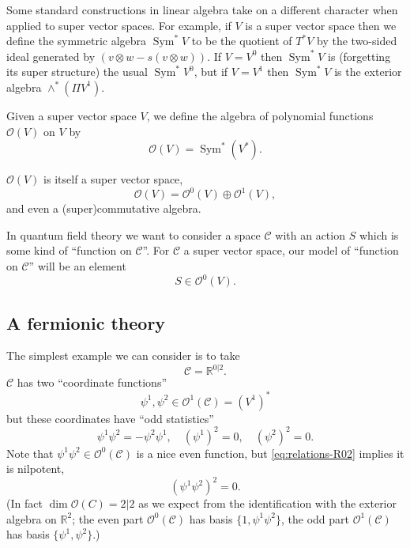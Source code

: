 \documentclass[12pt,letterpaper,reqno]{article}
\numberwithin{equation}{section}
\newcommand{\cC}{\ensuremath{\mathcal C}}
\newcommand{\cO}{\ensuremath{\mathcal O}}
\newcommand{\R}{\ensuremath{\mathbb R}}
\DeclareMathOperator{\Sym}{Sym}
\begin{document}
Some standard constructions in linear algebra take on a different
character when applied to super vector spaces. For example,
if $V$ is a super vector space then we define the symmetric 
algebra $\Sym^* V$ to be the quotient of $T^* V$ by
the two-sided ideal generated by $(v \otimes w - s(v \otimes w))$.
If $V = V^0$ then $\Sym^*V$ is (forgetting its super structure) 
the usual $\Sym^* V^0$,
but if $V = V^1$ then $\Sym^* V$ is the exterior algebra $\wedge^* (\Pi V^1)$.

\begin{defn}
Given a super vector space $V$, 
we define the algebra of polynomial functions $\cO(V)$ on $V$
by
\begin{equation}
  \cO(V) = \Sym^* (V^*).
\end{equation}
\end{defn}

$\cO(V)$ is itself a super vector space,
\begin{equation}
  \cO(V) = \cO^0(V) \oplus \cO^1(V),
\end{equation}
and even a (super)commutative algebra.

In quantum field theory we want to consider a space $\cC$ 
with an action $S$ which is some kind of ``function on $\cC$''. 
For $\cC$ a super vector space, our model of ``function on $\cC$''
will be an element
\begin{equation}
S \in \cO^0(V).
\end{equation}


\subsection{A fermionic theory}

The simplest example we can consider is to take
\begin{equation}
  \cC = \R^{0 \vert 2}.
\end{equation}
$\cC$ has two ``coordinate functions''
\begin{equation}
  \psi^1, \psi^2 \in \cO^1(\cC) = (V^1)^*
\end{equation}
but these coordinates have ``odd statistics''
\begin{equation} \label{eq:relations-R02}
  \psi^1 \psi^2 = -\psi^2 \psi^1, \quad (\psi^1)^2 = 0, \quad (\psi^2)^2 = 0.
\end{equation}
Note that $\psi^1 \psi^2 \in \cO^0(\cC)$ is a nice even function,
but \eqref{eq:relations-R02} implies it is nilpotent,
\begin{equation}
  (\psi^1 \psi^2)^2 = 0.
\end{equation}
(In fact $\dim \cO(C) = 2 \vert 2$ as we expect from the identification
with the exterior algebra on $\R^2$; the even part $\cO^0(\cC)$ has basis
$\{1, \psi^1 \psi^2\}$, the odd part $\cO^1(\cC)$ has basis $\{\psi^1, \psi^2\}$.)
\end{document}
